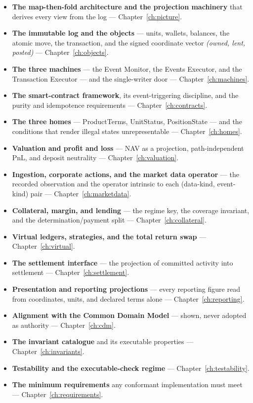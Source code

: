 \begin{itemize}[leftmargin=*, itemsep=2.5pt]
\item \textbf{The map-then-fold architecture and the projection machinery} that derives
  every view from the log --- Chapter~\ref{ch:picture}.
\item \textbf{The immutable log and the objects} --- units, wallets, balances, the atomic
  move, the transaction, and the signed coordinate vector \emph{(owned, lent, posted)} ---
  Chapter~\ref{ch:objects}.
\item \textbf{The three machines} --- the Event Monitor, the Events Executor, and the
  Transaction Executor --- and the single-writer door --- Chapter~\ref{ch:machines}.
\item \textbf{The smart-contract framework}, its event-triggering discipline, and the
  purity and idempotence requirements --- Chapter~\ref{ch:contracts}.
\item \textbf{The three homes} --- ProductTerms, UnitStatus, PositionState --- and the
  conditions that render illegal states unrepresentable --- Chapter~\ref{ch:homes}.
\item \textbf{Valuation and profit and loss} --- NAV as a projection, path-independent PnL,
  and deposit neutrality --- Chapter~\ref{ch:valuation}.
\item \textbf{Ingestion, corporate actions, and the market data operator} --- the recorded
  observation and the operator intrinsic to each (data-kind, event-kind) pair ---
  Chapter~\ref{ch:marketdata}.
\item \textbf{Collateral, margin, and lending} --- the regime key, the coverage invariant,
  and the determination/payment split --- Chapter~\ref{ch:collateral}.
\item \textbf{Virtual ledgers, strategies, and the total return swap} ---
  Chapter~\ref{ch:virtual}.
\item \textbf{The settlement interface} --- the projection of committed activity into
  settlement --- Chapter~\ref{ch:settlement}.
\item \textbf{Presentation and reporting projections} --- every reporting figure read from
  coordinates, units, and declared terms alone --- Chapter~\ref{ch:reporting}.
\item \textbf{Alignment with the Common Domain Model} --- shown, never adopted as authority
  --- Chapter~\ref{ch:cdm}.
\item \textbf{The invariant catalogue} and its executable properties ---
  Chapter~\ref{ch:invariants}.
\item \textbf{Testability and the executable-check regime} ---
  Chapter~\ref{ch:testability}.
\item \textbf{The minimum requirements} any conformant implementation must meet ---
  Chapter~\ref{ch:requirements}.
\end{itemize}


